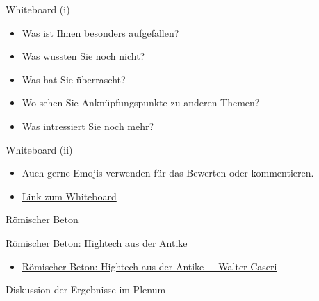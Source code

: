 \begin{frame}{Whiteboard (i)}
    \begin{Fragenblock}
        \begin{itemize}
            \item[\textbullet]  Was ist Ihnen besonders aufgefallen?
            \item[\textbullet]  Was wussten Sie noch nicht?
            \item[\textbullet]  Was hat Sie überrascht?
            \item[\textbullet]  Wo sehen Sie Anknüpfungspunkte zu anderen Themen?
            \item[\textbullet]  Was intressiert Sie noch mehr?
        \end{itemize}
    \end{Fragenblock}

\end{frame}


\begin{frame}{Whiteboard (ii)}

    \begin{itemize}
        \item[\textbullet] Auch gerne Emojis verwenden für das Bewerten oder kommentieren.
        \item[\textbullet] \href{https://schweizerischebau-my.sharepoint.com/:wb:/g/personal/pfaendler_bauschule_ch/EdyoT3CFufxPt8-uCapvAboB959KePV2RNeFZL2vQjeKBA?e=PM8NQJ}{Link zum Whiteboard}
    \end{itemize}

\end{frame}


\begin{frame}{Römischer Beton}
    \begin{block}{Römischer Beton: Hightech aus der Antike}
        \begin{itemize}
            \item \href{https://www.youtube.com/watch?v=aTDvEkWylng&t=923s}{Römischer Beton: Hightech aus der Antike –-  Walter Caseri}
        \end{itemize}

    \end{block}
\end{frame}

\begin{frame}{Diskussion der Ergebnisse im Plenum}

\end{frame}

